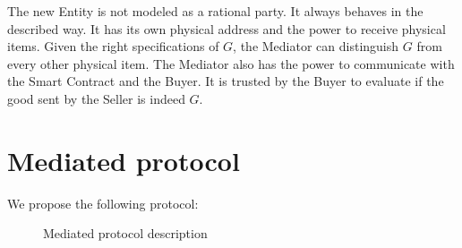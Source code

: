 \documentclass{cacthesis}
\begin{document}
The new Entity is not modeled as a rational party. It always behaves in the described way. It has its own physical address and the power to receive physical items. Given the right specifications of $G$, the Mediator can distinguish $G$ from every other  physical item. The Mediator also has the power to communicate with the Smart Contract and the Buyer. It is trusted by the Buyer to evaluate if the good sent by the Seller is indeed $G$.
\section{Mediated protocol}
\label{sec:mediated-protocol}
We propose the following protocol:
\begin{figure}[htb!]
    \centering
    \caption{Mediated protocol description}
    \label{pro:mediated-protocol}
\end{figure}
\newpage
\end{document}
